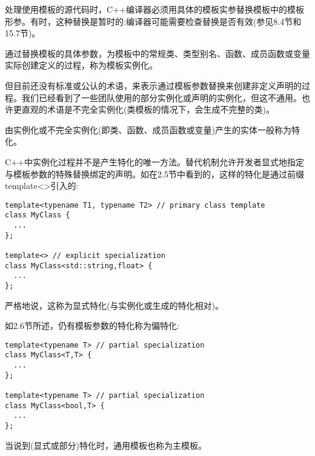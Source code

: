 处理使用模板的源代码时，C++编译器必须用具体的模板实参替换模板中的模板形参。有时，这种替换是暂时的:编译器可能需要检查替换是否有效(参见8.4节和15.7节)。

通过替换模板的具体参数，为模板中的常规类、类型别名、函数、成员函数或变量实际创建定义的过程，称为模板实例化。

但目前还没有标准或公认的术语，来表示通过模板参数替换来创建非定义声明的过程。我们已经看到了一些团队使用的部分实例化或声明的实例化，但这不通用。也许更直观的术语是不完全实例化(类模板的情况下，会生成不完整的类)。

由实例化或不完全实例化(即类、函数、成员函数或变量)产生的实体一般称为特化。

C++中实例化过程并不是产生特化的唯一方法。替代机制允许开发者显式地指定与模板参数的特殊替换绑定的声明。如在2.5节中看到的，这样的特化是通过前缀template<>引入的:

\begin{lstlisting}[style=styleCXX]
template<typename T1, typename T2> // primary class template
class MyClass {
  ...
};

template<> // explicit specialization
class MyClass<std::string,float> {
  ...
};
\end{lstlisting}

严格地说，这称为显式特化(与实例化或生成的特化相对)。

如2.6节所述，仍有模板参数的特化称为偏特化:

\begin{lstlisting}[style=styleCXX]
template<typename T> // partial specialization
class MyClass<T,T> {
  ...
};

template<typename T> // partial specialization
class MyClass<bool,T> {
  ...
};
\end{lstlisting}

当说到(显式或部分)特化时，通用模板也称为主模板。
